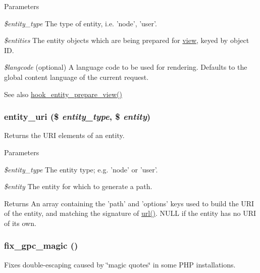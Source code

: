 \begin{DoxyParams}{Parameters}
\item[{\em \$entity\_\-type}]The type of entity, i.e. 'node', 'user'. \item[{\em \$entities}]The entity objects which are being prepared for \hyperlink{classview}{view}, keyed by object ID. \item[{\em \$langcode}](optional) A language code to be used for rendering. Defaults to the global content language of the current request.\end{DoxyParams}
\begin{DoxySeeAlso}{See also}
\hyperlink{group__hooks_ga7e60ef817e60b20497bda315d2f30163}{hook\_\-entity\_\-prepare\_\-view()} 
\end{DoxySeeAlso}
\hypertarget{common_8inc_a00f3b77a23f66be91c30ae42d8ea40cd}{
\subsubsection[{entity\_\-uri}]{\setlength{\rightskip}{0pt plus 5cm}entity\_\-uri (\$ {\em entity\_\-type}, \/  \$ {\em entity})}}
\label{common_8inc_a00f3b77a23f66be91c30ae42d8ea40cd}
Returns the URI elements of an entity.


\begin{DoxyParams}{Parameters}
\item[{\em \$entity\_\-type}]The entity type; e.g. 'node' or 'user'. \item[{\em \$entity}]The entity for which to generate a path. \end{DoxyParams}
\begin{DoxyReturn}{Returns}
An array containing the 'path' and 'options' keys used to build the URI of the entity, and matching the signature of \hyperlink{common_8inc_a43b2a0594431556db49df980801d8807}{url()}. NULL if the entity has no URI of its own. 
\end{DoxyReturn}
\hypertarget{common_8inc_abefb935bf3c61840ba9ad50adb13f766}{
\subsubsection[{fix\_\-gpc\_\-magic}]{\setlength{\rightskip}{0pt plus 5cm}fix\_\-gpc\_\-magic ()}}
\label{common_8inc_abefb935bf3c61840ba9ad50adb13f766}
Fixes double-\/escaping caused by \char`\"{}magic quotes\char`\"{} in some PHP installations.

